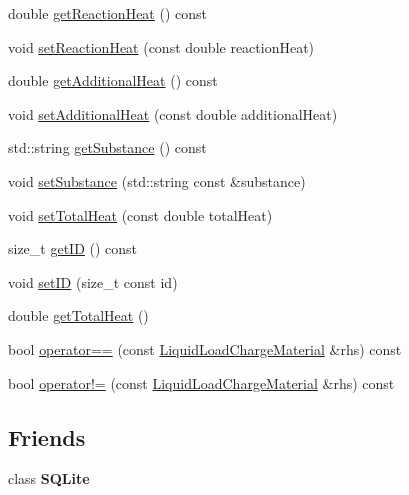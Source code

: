 \begin{DoxyCompactItemize}
\item 
double \hyperlink{class_liquid_load_charge_material_a2f0c26e789e98efd1e8fd0c8741ddd92}{get\+Reaction\+Heat} () const
\item 
void \hyperlink{class_liquid_load_charge_material_a793c7ebc2643b2af0eaf21b9cb788775}{set\+Reaction\+Heat} (const double reaction\+Heat)
\item 
double \hyperlink{class_liquid_load_charge_material_a6b79cd1aec59a7f7119a8abfa9e5859b}{get\+Additional\+Heat} () const
\item 
void \hyperlink{class_liquid_load_charge_material_a557c1f588cfb972ff0c7f748d6c2bd8f}{set\+Additional\+Heat} (const double additional\+Heat)
\item 
std\+::string \hyperlink{class_liquid_load_charge_material_a8f925c04c15ed889ba3fd7c4b628dbff}{get\+Substance} () const
\item 
void \hyperlink{class_liquid_load_charge_material_a85bb43270c6a11a1eaf51f00da16746a}{set\+Substance} (std\+::string const \&substance)
\item 
void \hyperlink{class_liquid_load_charge_material_ad45afc317b72c89cc46016e0b05b50b3}{set\+Total\+Heat} (const double total\+Heat)
\item 
size\+\_\+t \hyperlink{class_liquid_load_charge_material_a07e869cabd98a5179536559a1c0f4b35}{get\+ID} () const
\item 
void \hyperlink{class_liquid_load_charge_material_a3f6654f1d9387366e0ca7620ecc41361}{set\+ID} (size\+\_\+t const id)
\item 
double \hyperlink{class_liquid_load_charge_material_a51a9826325e2c34cd073b8766331d476}{get\+Total\+Heat} ()
\item 
bool \hyperlink{class_liquid_load_charge_material_ad2090d1628f26e46339e9e164b47d3a2}{operator==} (const \hyperlink{class_liquid_load_charge_material}{Liquid\+Load\+Charge\+Material} \&rhs) const
\item 
bool \hyperlink{class_liquid_load_charge_material_aa6ad825ee8ab1c7816ce3bf10260c0bb}{operator!=} (const \hyperlink{class_liquid_load_charge_material}{Liquid\+Load\+Charge\+Material} \&rhs) const
\end{DoxyCompactItemize}
\subsection*{Friends}
\begin{DoxyCompactItemize}
\item 
\mbox{\label{class_liquid_load_charge_material_ac7d22f3ca36435f73d55df60dc799e14}} 
class {\bfseries S\+Q\+Lite}
\end{DoxyCompactItemize}



